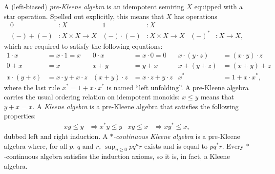 \documentclass[11pt,a4paper]{amsart}
\theoremstyle{definition}
\begin{document}
A (left-biased) \emph{pre-Kleene algebra} is an idempotent semiring $X$
equipped with a star operation. Spelled out explicitly, this means that $X$ has
operations
\begin{align*}
  0 & : X &
  1 & : X \\
  (-)+(-) & : X \times X \to X &
  (-)\cdot(-) & : X \times X \to X &
  (-)^* & : X \to X,
\end{align*}
which are required to satisfy the following equations:
\begin{align*}
  1 \cdot x & = x \cdot 1 = x & 
  0 \cdot x & = x \cdot 0 = 0 &
  x \cdot (y \cdot z) & = (x \cdot y) \cdot z \\
  0 + x & = x & 
  x + y & = y + x &
  x + (y + z) & = (x + y) + z \\
  x \cdot (y + z) & = x \cdot y + x \cdot z & 
  (x + y) \cdot z & = x \cdot z + y \cdot z &
  x^* & = 1 + x \cdot x^*,
\end{align*}
where the last rule \(x^* = 1 + x \cdot x^*\) is named ``left unfolding''.  A
pre-Kleene algebra carries the usual ordering relation on idempotent monoids:
$x \leq y$ means that $y + x = x$.  A \emph{Kleene algebra} is a pre-Kleene
algebra that satisfies the following properties:
\begin{align*}
  xy \le y & \Rightarrow x^*y \le y & xy \le x & \Rightarrow xy^* \le x,
\end{align*}
dubbed left and right induction.  A \emph{$*$-continuous Kleene algebra} is a
pre-Kleene algebra where, for all $p$, $q$ and $r$, $\sup_{n \geq 0}pq^nr$
exists and is equal to $pq^*r$.  Every $*$-continuous algebra satisfies the
induction axioms, so it is, in fact, a Kleene algebra.
\end{document}
